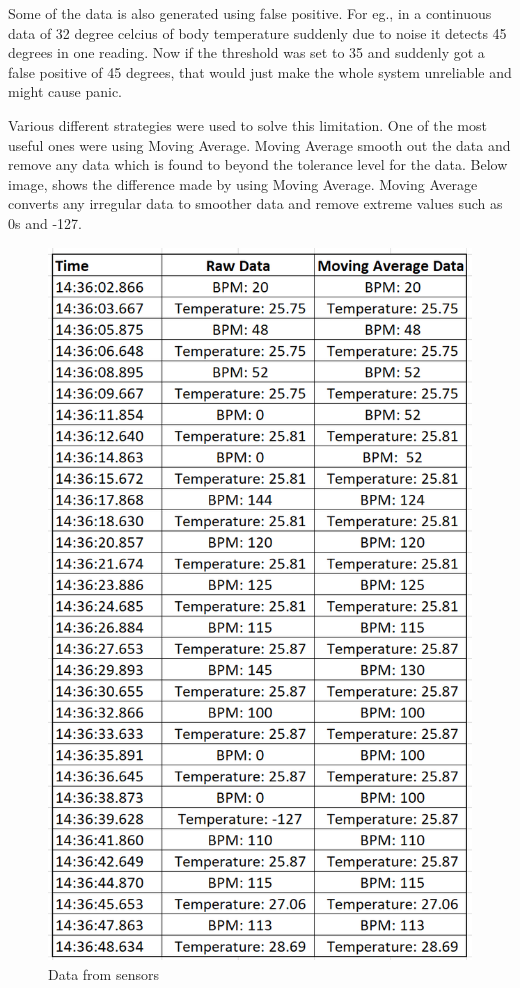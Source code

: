 Some of the data is also generated using false positive. For eg., in a continuous data of 32 degree celcius of body temperature suddenly due to noise it detects 45 degrees in one reading. Now if the threshold was set to 35 and suddenly got a false positive of 45 degrees, that would just make the whole system unreliable and might cause panic.  

Various different strategies were used to solve this limitation. One of the most useful ones were using Moving Average. Moving Average smooth out the data and remove any data which is found to beyond the tolerance level for the data. Below image, shows the difference made by using Moving Average. Moving Average converts any irregular data to smoother data and remove extreme values such as 0s and -127. 

\begin{figure}[h!]
    \centering
    \includegraphics[width=0.8\linewidth]{images/data.png}
    \caption{Data from sensors}
    \label{fig:data-sensors}
\end{figure}

